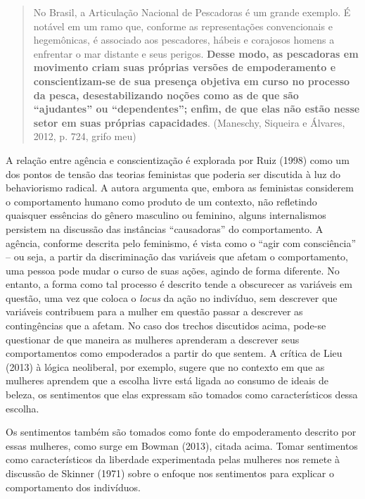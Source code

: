 \begin{quote}
    No Brasil, a Articulação Nacional de Pescadoras é um grande exemplo. É notável em um ramo que, conforme as representações convencionais e hegemônicas, é associado aos pescadores, hábeis e corajosos homens a enfrentar o mar distante e seus perigos. \textbf{Desse modo, as pescadoras em movimento criam suas próprias versões de empoderamento e conscientizam-se de sua presença objetiva em curso no processo da pesca, desestabilizando noções como as de que são ``ajudantes'' ou ``dependentes''; enfim, de que elas não estão nesse setor em suas próprias capacidades}. (Maneschy, Siqueira e Álvares, 2012, p. 724, grifo meu)
\end{quote}

A relação entre agência e conscientização é explorada por Ruiz (1998) como um dos pontos de tensão das teorias feministas que poderia ser discutida à luz do behaviorismo radical. A autora argumenta que, embora as feministas considerem o comportamento humano como produto de um contexto, não refletindo quaisquer essências do gênero masculino ou feminino, alguns internalismos persistem na discussão das instâncias ``causadoras'' do comportamento. A agência, conforme descrita pelo feminismo, é vista como o ``agir com consciência'' – ou seja, a partir da discriminação das variáveis que afetam o comportamento, uma pessoa pode mudar o curso de suas ações, agindo de forma diferente. No entanto, a forma como tal processo é descrito tende a obscurecer as variáveis em questão, uma vez que coloca o \textit{locus} da ação no indivíduo, sem descrever que variáveis contribuem para a mulher em questão passar a descrever as contingências que a afetam. No caso dos trechos discutidos acima, pode-se questionar de que maneira as mulheres aprenderam a descrever seus comportamentos como empoderados a partir do que sentem. A crítica de Lieu (2013) à lógica neoliberal, por exemplo, sugere que no contexto em que as mulheres aprendem que a escolha livre está ligada ao consumo de ideais de beleza, os sentimentos que elas expressam são tomados como característicos dessa escolha.

Os sentimentos também são tomados como fonte do empoderamento descrito por essas mulheres, como surge em Bowman (2013), citada acima. Tomar sentimentos como característicos da liberdade experimentada pelas mulheres nos remete à discussão de Skinner (1971) sobre o enfoque nos sentimentos para explicar o comportamento dos indivíduos.


